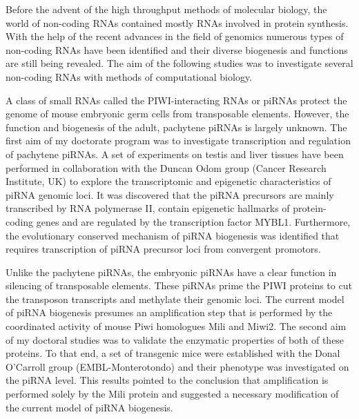 


\begin{abstracts}        %

Before the advent of the high throughput methods of molecular biology, the world of non-coding RNAs contained mostly RNAs involved in protein synthesis. With the help of the recent advances in the field of genomics numerous types of non-coding RNAs have been identified and their diverse biogenesis and functions are still being revealed. The aim of the following studies was to investigate several non-coding RNAs with methods of computational biology.

	A class of small RNAs called the PIWI-interacting RNAs or piRNAs protect the genome of mouse embryonic germ cells from transposable elements.  However, the function and biogenesis of the adult, pachytene piRNAs is largely unknown. The first aim of my doctorate program was to investigate transcription and regulation of pachytene piRNAs. A set of experiments on testis and liver tissues have been performed in collaboration with the Duncan Odom group (Cancer Research Institute, UK) to explore the transcriptomic and epigenetic characteristics of piRNA genomic loci. It was discovered that the piRNA precursors are mainly transcribed by RNA polymerase II, contain epigenetic hallmarks of protein-coding genes and are regulated by the transcription factor MYBL1. Furthermore, the evolutionary conserved mechanism of piRNA biogenesis was identified that requires transcription of piRNA precursor loci from convergent promotors. 

Unlike the pachytene piRNAs, the embryonic piRNAs have a clear function in silencing of transposable elements. These piRNAs prime the PIWI proteins to cut the transposon transcripts and methylate their genomic loci. The current model of piRNA biogenesis presumes an amplification step that is performed by the coordinated activity of mouse Piwi homologues Mili and Miwi2. The second aim of my doctoral studies was  to validate the enzymatic properties of both of these proteins. To that end, a set of transgenic mice were established with the Donal O'Carroll group (EMBL-Monterotondo) and their phenotype was investigated on the piRNA level. This results pointed to the conclusion that amplification is performed solely by the Mili protein and suggested a necessary modification of the current model of piRNA biogenesis.


\end{abstracts}
